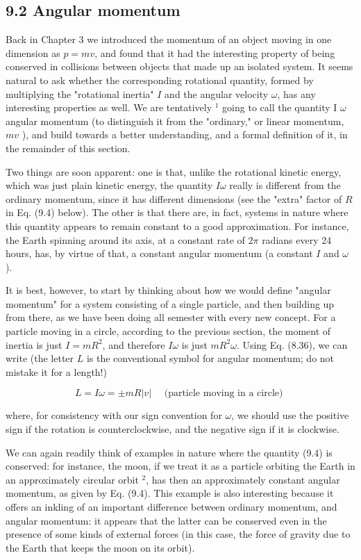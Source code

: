\documentclass[10pt]{article}
\begin{document}
\subsection*{9.2 Angular momentum}
Back in Chapter 3 we introduced the momentum of an object moving in one dimension as $p=m v$, and found that it had the interesting property of being conserved in collisions between objects that made up an isolated system. It seems natural to ask whether the corresponding rotational quantity, formed by multiplying the "rotational inertia" $I$ and the angular velocity $\omega$, has any interesting properties as well. We are tentatively ${ }^{1}$ going to call the quantity I $\omega$ angular momentum (to distinguish it from the "ordinary," or linear momentum, $m v$ ), and build towards a better understanding, and a formal definition of it, in the remainder of this section.

Two things are soon apparent: one is that, unlike the rotational kinetic energy, which was just plain kinetic energy, the quantity $I \omega$ really is different from the ordinary momentum, since it has different dimensions (see the "extra" factor of $R$ in Eq. (9.4) below). The other is that there are, in fact, systems in nature where this quantity appears to remain constant to a good approximation. For instance, the Earth spinning around its axis, at a constant rate of $2 \pi$ radians every 24 hours, has, by virtue of that, a constant angular momentum (a constant $I$ and $\omega$ ).

It is best, however, to start by thinking about how we would define "angular momentum" for a system consisting of a single particle, and then building up from there, as we have been doing all semester with every new concept. For a particle moving in a circle, according to the previous section, the moment of inertia is just $I=m R^{2}$, and therefore $I \omega$ is just $m R^{2} \omega$. Using Eq. (8.36), we can write (the letter $L$ is the conventional symbol for angular momentum; do not mistake it for a length!)


\begin{equation*}
L=I \omega= \pm m R|v| \quad \text { (particle moving in a circle) } \tag{9.4}
\end{equation*}


where, for consistency with our sign convention for $\omega$, we should use the positive sign if the rotation is counterclockwise, and the negative sign if it is clockwise.

We can again readily think of examples in nature where the quantity (9.4) is conserved: for instance, the moon, if we treat it as a particle orbiting the Earth in an approximately circular orbit ${ }^{2}$, has then an approximately constant angular momentum, as given by Eq. (9.4). This example is also interesting because it offers an inkling of an important difference between ordinary momentum, and angular momentum: it appears that the latter can be conserved even in the presence of some kinds of external forces (in this case, the force of gravity due to the Earth that keeps the moon on its orbit).
\end{document}
